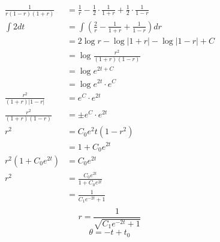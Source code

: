 \documentclass[letterpaper,12pt]{article}
\begin{document}
\begin{align*}
    \frac{1}{r(1-r)(1+r)} &= \frac{1}{r} - \frac{1}{2}\cdot \frac{1}{1+r} + \frac{1}{2} \cdot \frac{1}{1-r}\\
                         \int 2dt &= \int (\frac{2}{r} - \frac{1}{1+r} + \frac{1}{1-r})dr \\
                             &= 2\log r - \log \lvert 1+r \rvert - \log \lvert 1-r \rvert + C \\
                             &= \log \frac{r^2}{(1+r)(1-r)}\\
                             &=\log{e^{2t + C}}\\
                             &= \log e^{2t} \cdot e^C\\
                         \frac{r^2}{(1+r)\lvert 1 - r \rvert} &= e^C \cdot e^{2t}\\
                          \frac{r^2}{(1+r)(1 - r)}  &= \pm e^C \cdot e^{2t}\\
                          r^2 &= C_0 e^2t (1-r^2)\\
                              &= 1+ C_0e^{2t}\\
                          r^2(1+C_0e^{2t})  &= C_0e^{2t}\\
                          r^2 &= \frac{C_0 e^{2t}}{1+C_0 e^{2t}}\\
                              &= \frac{1}{C_1 e^{-2t}+1}\\
\end{align*}
\[
    r = \frac{1}{\sqrt{C_1 e^{-2t}+1}}
\]
\[
    \theta = -t + t_0
\]
\end{document}
